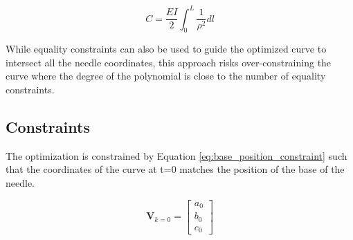 \begin{equation}
\label{eq:cost_function}
C = \frac{EI}{2} \int_{0}^{L} \frac{1}{\rho^2}dl
\end{equation}

While equality constraints can also be used to guide the optimized curve to intersect all the needle coordinates, this approach risks over-constraining the curve where the degree of the polynomial is close to the number of equality constraints.



\subsection{Constraints}
The optimization is constrained by Equation \ref{eq:base_position_constraint} such that the coordinates of the curve at t=0 matches the position of the base of the needle.
 
 \begin{equation}
 \label{eq:base_position_constraint}
 \textbf{V}_{k=0}=\begin{bmatrix} a_0 \\ b_0 \\ c_0 \end{bmatrix}
 \end{equation}

